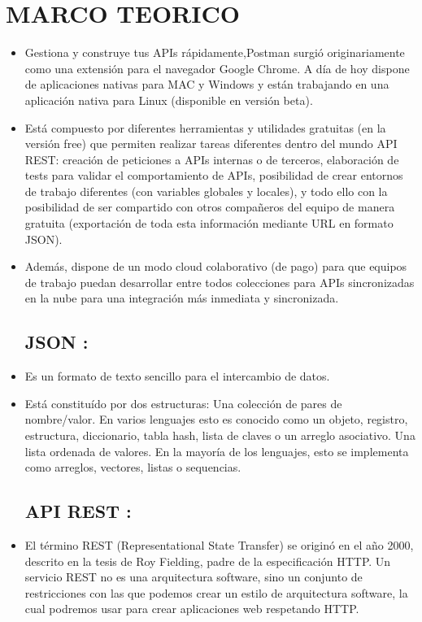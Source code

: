 \section{MARCO TEORICO} 
\begin{itemize}
\subsection{Postman:}
	\item Gestiona y construye tus APIs rápidamente,Postman surgió originariamente como una extensión para el navegador Google Chrome. A día de hoy dispone de aplicaciones nativas para MAC y Windows y están trabajando en una aplicación nativa para Linux (disponible en versión beta).
	\item Está compuesto por diferentes herramientas y utilidades gratuitas (en la versión free) que permiten realizar tareas diferentes dentro del mundo API REST: creación de peticiones a APIs internas o de terceros, elaboración de tests para validar el comportamiento de APIs, posibilidad de crear entornos de trabajo diferentes (con variables globales y locales), y todo ello con la posibilidad de ser compartido con otros compañeros del equipo de manera gratuita (exportación de toda esta información mediante URL en formato JSON).
	\item Además, dispone de un modo cloud colaborativo (de pago) para que equipos de trabajo puedan desarrollar entre todos colecciones para APIs sincronizadas en la nube para una integración más inmediata y sincronizada.

\subsection{JSON :}
	\item Es un formato de texto sencillo para el intercambio de datos. 
          \item  Está constituído por dos estructuras:
Una colección de pares de nombre/valor. En varios lenguajes esto es conocido como un objeto, registro, estructura, diccionario, tabla hash, lista de claves o un arreglo asociativo.
Una lista ordenada de valores. En la mayoría de los lenguajes, esto se implementa como arreglos, vectores, listas o sequencias.
\subsection{API REST :}
          \item El término REST (Representational State Transfer) se originó en el año 2000, descrito en la tesis de Roy Fielding, padre de la especificación HTTP. Un servicio REST no es una arquitectura software, sino un conjunto de restricciones con las que podemos crear un estilo de arquitectura software, la cual podremos usar para crear aplicaciones web respetando HTTP. 

\end{itemize}
